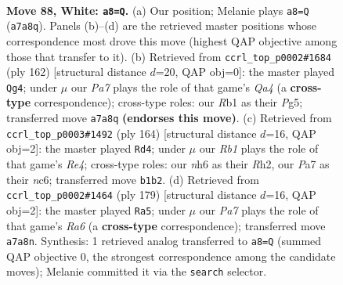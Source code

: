 \documentclass[11pt]{article}
\begin{document}
\clearpage

\begin{figure}[p]\centering
\begin{subfigure}{0.46\textwidth}\centering
\resizebox{\linewidth}{!}{%
\newchessgame
\chessboard[
  setfen={8/PP5k/7n/8/8/8/7r/KR6 w - - 1 88},
  showmover=false,
  pgfstyle=straightmove, color=movearrow, markmove={a7-a8}
]}
\caption{}
\end{subfigure}\hfill
\begin{subfigure}{0.46\textwidth}\centering
\resizebox{\linewidth}{!}{%
\newchessgame
\chessboard[
  setfen={3k4/4n3/4r3/6PK/Q7/8/8/8 w - - 15 82},
  showmover=false,
  pgfstyle=straightmove, color=movearrow, markmove={a4-g4}
]}
\caption{}
\end{subfigure}
\\[4pt]
\begin{subfigure}{0.46\textwidth}\centering
\resizebox{\linewidth}{!}{%
\newchessgame
\chessboard[
  setfen={8/5r2/2n5/1k6/4R3/4K3/7R/8 w - - 11 83},
  showmover=false,
  pgfstyle=straightmove, color=movearrow, markmove={e4-d4}
]}
\caption{}
\end{subfigure}\hfill
\begin{subfigure}{0.46\textwidth}\centering
\resizebox{\linewidth}{!}{%
\newchessgame
\chessboard[
  setfen={8/8/8/3NK2R/6r1/r5k1/8/8 b - - 21 90},
  showmover=false,
  pgfstyle=straightmove, color=movearrow, markmove={a3-a5}
]}
\caption{}
\end{subfigure}
\caption{\textbf{Move 88, White: \texttt{a8=Q}.} (a) Our position; Melanie plays \texttt{a8=Q} (\texttt{a7a8q}). Panels (b)--(d) are the retrieved master positions whose correspondence most drove this move (highest QAP objective among those that transfer to it). (b) Retrieved from \texttt{ccrl\_top\_p0002\#1684} (ply 162) [structural distance $d$=20, QAP obj=0]: the master played \texttt{Qg4}; under $\mu$ our \emph{Pa7} plays the role of that game's \emph{Qa4} (a \textbf{cross-type} correspondence); cross-type roles: our \emph{R}b1 as their \emph{P}g5; transferred move \texttt{a7a8q} \textbf{(endorses this move)}. (c) Retrieved from \texttt{ccrl\_top\_p0003\#1492} (ply 164) [structural distance $d$=16, QAP obj=2]: the master played \texttt{Rd4}; under $\mu$ our \emph{Rb1} plays the role of that game's \emph{Re4}; cross-type roles: our \emph{n}h6 as their \emph{R}h2, our \emph{P}a7 as their \emph{n}c6; transferred move \texttt{b1b2}. (d) Retrieved from \texttt{ccrl\_top\_p0002\#1464} (ply 179) [structural distance $d$=16, QAP obj=2]: the master played \texttt{Ra5}; under $\mu$ our \emph{Pa7} plays the role of that game's \emph{Ra6} (a \textbf{cross-type} correspondence); transferred move \texttt{a7a8n}. Synthesis: 1 retrieved analog transferred to \texttt{a8=Q} (summed QAP objective 0, the strongest correspondence among the candidate moves); Melanie committed it via the \texttt{search} selector.}
\label{fig:thought-m174}
\end{figure}
\end{document}

